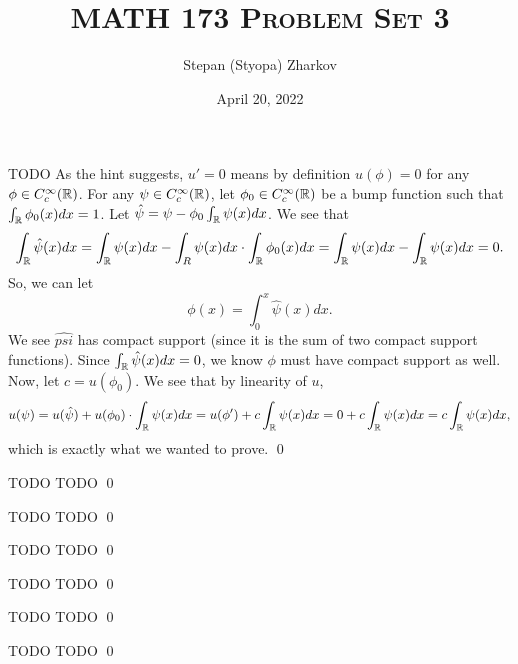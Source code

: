 \documentclass{article}
\title{\textsc{MATH 173 Problem Set 3}}
\author{Stepan (Styopa) Zharkov}
\date{April 20, 2022}
\newcommand{\Cc}{{C_c^\infty(\RR)}}
\begin{document}
\maketitle
{} TODO \tri
\hop
\solution
As the hint suggests, $u' = 0$ means by definition $u(\phi) = 0$ for any $\phi \in C_c^\infty(\mathbb{R})$. For any $\psi \in \Cc$, let $\phi_0\in \Cc$ be a bump function such that $\int_{\mathbb{R}} \phi_0(x)dx = 1$. Let $\hat{\psi} = \psi - \phi_0\int_{\mathbb{R}}\psi(x)dx$. We see that 
\[\int_{\mathbb{R}} \hat{\psi}(x)dx = \int_{\mathbb{R}} \psi(x)dx -\int_R\psi(x)dx\cdot \int_{\mathbb{R}}\phi_0(x)dx =\int_{\mathbb{R}} \psi(x)dx-\int_{\mathbb{R}} \psi(x)dx = 0.\]
So, we can let 
\[\phi(x) = \int_0^x \hat{\psi}(x) dx.\]
We see $\hat{psi}$ has compact support (since it is the sum of two compact support functions). Since $\int_{\mathbb{R}} \hat{\psi}(x)dx = 0$, we know $\phi$ must have compact support as well. Now, let $c = u(\phi_0)$. We see that by linearity of $u$,
\[u(\psi) = u(\hat{\psi}) + u(\phi_0)\cdot \int_{\mathbb{R}}\psi(x)dx = u(\phi') + c\int_{\mathbb{R}}\psi(x)dx =0+  c\int_{\mathbb{R}}\psi(x)dx=c\int_{\mathbb{R}}\psi(x)dx, \]
which is exactly what we wanted to prove. 
\qed


\newpage
{} TODO \tri
\hop
\solution
TODO
\qed


\newpage
{} TODO \tri
\hop
\solution
TODO
\qed


\newpage
{} TODO \tri
\hop
\solution
TODO
\qed


\newpage
{} TODO \tri
\hop
\solution
TODO
\qed


\newpage
{} TODO \tri
\hop
\solution
TODO
\qed


\newpage
{} TODO \tri
\hop
\solution
TODO
\qed


\newpage
\end{document}
